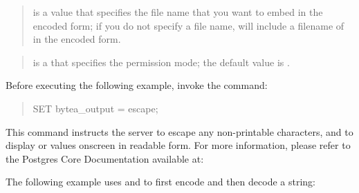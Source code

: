 \documentclass[letterpaper,10pt,english,openany,oneside]{sphinxmanual}
\begin{document}
\begin{quote}

 is a  value that specifies the file name that you
want to embed in the encoded form; if you do not specify a file
name,  will include a filename of  in the
encoded form.
\end{quote}

\begin{quote}

 is a  that specifies the permission mode; the
default value is .
\end{quote}


Before executing the following example, invoke the command:
\begin{quote}

SET bytea\_output = escape;
\end{quote}

This command instructs the server to escape any non-printable
characters, and to display  or  values onscreen in readable
form. For more information, please refer to the Postgres Core
Documentation available at:


\newpage

The following example uses  and  to first encode and
then decode a string:
\end{document}
